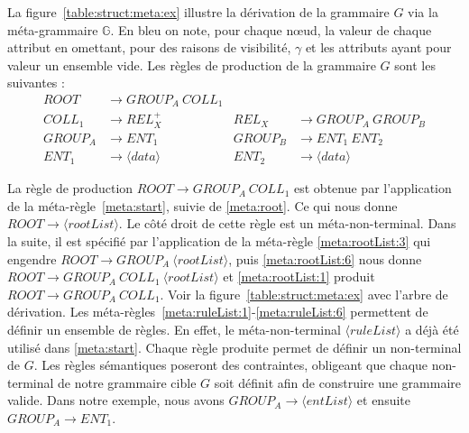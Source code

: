 \begin{example}
    \label{ex:struct:meta}
    La figure~\ref{table:struct:meta:ex} illustre la dérivation de la grammaire $G$ via la méta-grammaire $\mathbb{G}$.
    En bleu on note, pour chaque nœud, la valeur de chaque attribut en omettant, pour des raisons de visibilité, $\gamma$ et les attributs ayant pour valeur un ensemble vide.
    Les règles de production de la grammaire $G$ sont les suivantes :
    \begin{align*}
        ROOT    & \to GROUP_A ~ COLL_1                                          \\
        COLL_1  & \to REL_X^+              & REL_X   & \to GROUP_A ~ GROUP_B    \\
        GROUP_A & \to ENT_1                & GROUP_B & \to ENT_1 ~ ENT_2        \\
        ENT_1   & \to \langle data \rangle & ENT_2   & \to \langle data \rangle
    \end{align*}

    La règle de production $ROOT \rightarrow GROUP_A ~ COLL_1$ est obtenue par l'application de la méta-règle~\ref{meta:start}, suivie de \ref{meta:root}.
    Ce qui nous donne $ROOT \rightarrow \langle rootList \rangle$.
    Le côté droit de cette règle est un méta-non-terminal.
    Dans la suite, il est spécifié par l'application de la méta-règle \ref{meta:rootList:3} qui engendre $ROOT \rightarrow GROUP_A ~ \langle rootList \rangle$, puis \ref{meta:rootList:6} nous donne $ROOT \rightarrow GROUP_A ~ COLL_1 ~ \langle rootList \rangle$ et \ref{meta:rootList:1} produit $ROOT \rightarrow GROUP_A ~ COLL_1$.
    Voir la figure~\ref{table:struct:meta:ex} avec l'arbre de dérivation.
    Les méta-règles~\ref{meta:ruleList:1}-\ref{meta:ruleList:6} permettent de définir un ensemble de règles.
    En effet, le méta-non-terminal $\langle ruleList \rangle$ a déjà été utilisé dans \ref{meta:start}.
    Chaque règle produite permet de définir un non-terminal de $G$.
    Les règles sémantiques poseront des contraintes, obligeant que chaque non-terminal de notre grammaire cible $G$ soit définit afin de construire une grammaire valide.
    Dans notre exemple, nous avons $GROUP_A \rightarrow  \langle entList \rangle$ et ensuite $GROUP_A \rightarrow ENT_1$.
\end{example}

\FloatBarrier
